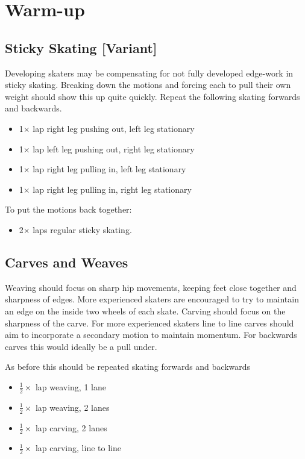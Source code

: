 \documentclass{journal}
\begin{document}
\pagebreak
\section*{Warm-up}
\label{sec:warmup}

\subsection*{Sticky Skating [Variant]}
\label{drill:sticky:sticky_one_foot}

Developing skaters may be compensating for not fully developed edge-work in sticky skating. Breaking down the motions and forcing each to pull their own weight should show this up quite quickly.  
Repeat the following skating forwards and backwards. 
\begin{itemize}
    \item 1$\times$ lap right leg pushing out, left leg stationary  
    \item 1$\times$ lap left leg pushing out, right leg stationary 
    \item 1$\times$ lap right leg pulling in, left leg stationary 
    \item 1$\times$ lap right leg pulling in, right leg stationary 
\end{itemize}

To put the motions back together:
\begin{itemize}
    \item 2$\times$ laps regular sticky skating. 
\end{itemize}


\subsection*{Carves and Weaves}
\label{drill:sticky:carves_and_weaves}
Weaving should focus on sharp hip movements, keeping feet close together and sharpness of edges. More experienced skaters are encouraged to try to maintain an edge on the inside two wheels of each skate.     
Carving should focus on the sharpness of the carve.
For more experienced skaters line to line carves should aim to incorporate a secondary motion to maintain momentum. For backwards carves this would ideally be a pull under.    

As before this should be repeated skating forwards and backwards
\begin{itemize}
    \item $\frac{1}{2}\times$ lap weaving, 1 lane 
    \item $\frac{1}{2}\times$ lap weaving, 2 lanes
    \item $\frac{1}{2}\times$ lap carving, 2 lanes 
    \item $\frac{1}{2}\times$ lap carving, line to line
\end{itemize}
\end{document}
